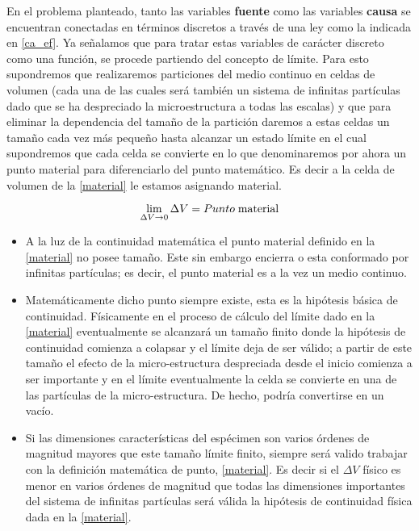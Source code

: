\documentclass[../notas medios.tex]{subfiles}
\begin{document}
En el problema planteado, tanto las variables {\bf fuente} como las variables
{\bf causa} se encuentran conectadas en términos discretos a través de una ley
como la indicada en \cref{ca_ef}. Ya señalamos que para tratar estas variables de carácter discreto  como una función, se procede partiendo del concepto de límite.  Para esto supondremos que realizaremos particiones del medio continuo en celdas de volumen (cada una de las cuales será también un sistema de infinitas partículas dado que se ha despreciado la microestructura a todas las escalas) y que para eliminar la dependencia del tamaño de la partición daremos a estas celdas un tamaño cada vez más pequeño hasta alcanzar un estado límite en el cual supondremos que cada celda se convierte en lo que denominaremos por ahora un punto material para diferenciarlo del punto matemático.  Es decir a la celda de volumen de la \cref{material} le estamos asignando material.

\begin{equation}
\mathop {\lim }\limits_{\Delta V \to 0} \Delta V = Punto\; {\rm{ material}}
\label{material}
\end{equation}

\begin{itemize}
\item A la luz de la continuidad matemática el punto material definido en la \cref{material} no posee tamaño.  Este sin embargo encierra o esta conformado por infinitas partículas; es decir, el punto material es a la vez un medio continuo.

\item Matemáticamente dicho punto siempre existe, esta es la hipótesis básica de
continuidad.  Físicamente en el proceso de cálculo del límite dado en la
\cref{material} eventualmente se alcanzará un tamaño finito donde la hipótesis de continuidad comienza a colapsar y el límite deja de ser válido; a partir de este tamaño el efecto de la micro-estructura despreciada desde el inicio comienza a ser importante y en el límite eventualmente la celda se convierte en una de las partículas de la micro-estructura.  De hecho, podría convertirse en un vacío.

\item Si las dimensiones características del espécimen son varios órdenes de
magnitud mayores que este tamaño límite finito, siempre será valido trabajar con
la definición matemática de punto, \cref{material}.  Es decir si el $\Delta V$
físico es menor en varios órdenes de magnitud que todas las dimensiones
importantes del sistema de infinitas partículas será válida la hipótesis de
continuidad física dada en la \cref{material}.
  
\end{itemize}
\end{document}
